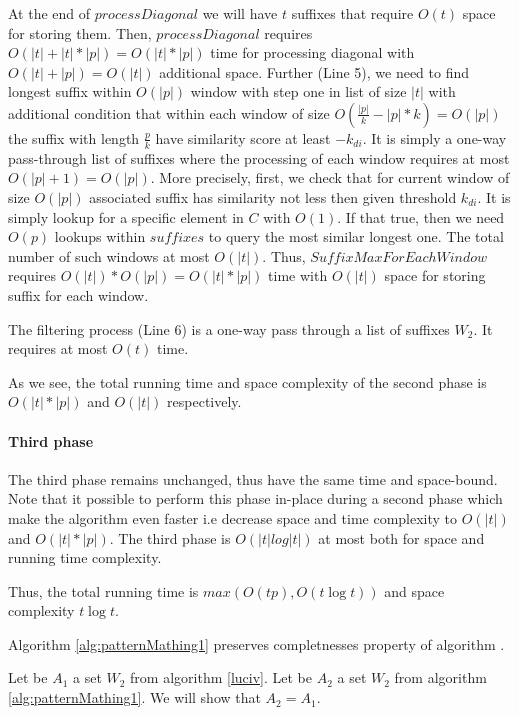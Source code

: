 At the end of  $processDiagonal$ we will have $t$ suffixes that require $O(t)$  space for storing them.
Then, $processDiagonal$ requires $O(|t|+|t|*|p|)=O(|t|*|p|)$ time for processing diagonal with $O(|t|+|p|)=O(|t|)$ additional space. 
Further (Line 5), we need to find longest suffix within $O(|p|)$ window with step one in list of size $|t|$ with additional condition that within each window of size $O(\frac{|p|}{k}-|p|*k)=O(|p|)$ the suffix with length $\frac{p}{k}$ have similarity score at least $-k_{di}$.
It is simply a one-way pass-through list of suffixes where the processing of each window requires at most $O(|p|+1)=O(|p|)$.
More precisely, first, we check that for current window of size $O(|p|)$
associated suffix has similarity not less then given threshold $k_{di}$.
It is simply lookup for a specific element in $C$ with $O(1)$.
If that true, then we need $O(p)$ lookups within $suffixes$ to query the most similar longest one.    
The total number of such windows at most $O(|t|)$.
Thus, $SuffixMaxForEachWindow$ requires $O(|t|)*O(|p|)=O(|t|*|p|)$ time with $O(|t|)$ space for storing suffix for each window. 

The filtering process (Line 6) is a one-way pass through a list of suffixes $W_2$.
It requires at most $O(t)$ time.

As we see, the total running time and space complexity of the second phase is $O(|t|*|p|)$ and $O(|t|)$ respectively.

\paragraph{Third phase}
The third phase remains unchanged, thus have the same time and space-bound.
Note that it possible to perform this phase in-place during a second phase which 
make the algorithm even faster i.e decrease space and time complexity to $O(|t|)$  and $O(|t|*|p|)$.
The third phase is $O(|t| log|t|)$  at most both for space and running time complexity.

Thus, the total running time is $max(O(tp),O(t \log t))$ and space complexity $t \log t$. 


\begin{theorem}
Algorithm \ref{alg:patternMathing1} preserves completnesses property of algorithm \cite{luciv2019interactive}.

\end{theorem}

Let be $A_1$ a set $W_{2}$ from algorithm \ref{luciv}.
Let be $A_2$ a set $W_{2}$ from algorithm \ref{alg:patternMathing1}.
We will show that $A_2 = A_1$.

